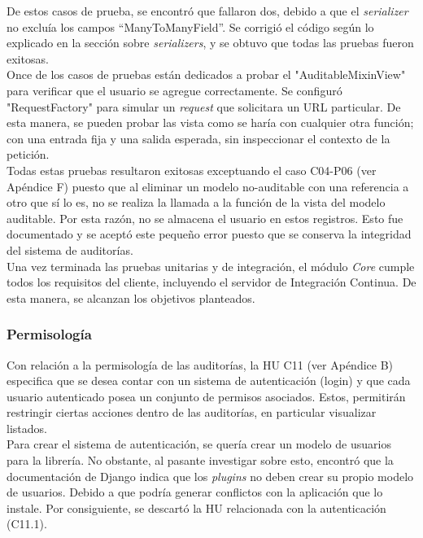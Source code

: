 De estos casos de prueba, se encontró que fallaron dos, debido a que el \textit{serializer} no excluía los campos “ManyToManyField”. Se corrigió el código según lo explicado en la sección sobre \textit{serializers}, y se obtuvo que todas las pruebas fueron exitosas.\\

Once de los casos de pruebas están dedicados a probar el "AuditableMixinView" para verificar que el usuario se agregue correctamente. Se configuró "RequestFactory" para simular un \textit{request} que solicitara un URL particular. De esta manera, se pueden probar las vista como se haría con cualquier otra función; con una entrada fija y una salida esperada, sin inspeccionar el contexto de la petición.\\

Todas estas pruebas resultaron exitosas exceptuando el caso C04-P06 (ver Apéndice F) puesto que al eliminar un modelo no-auditable con una referencia a otro que sí lo es, no se realiza la llamada a la función de la vista del modelo auditable. Por esta razón, no se almacena el usuario en estos registros. Esto fue documentado y se aceptó este pequeño error puesto que se conserva la integridad del sistema de auditorías.\\

Una vez terminada las pruebas unitarias y de integración, el módulo \textit{Core} cumple todos los requisitos del cliente, incluyendo el servidor de Integración Continua. De esta manera, se alcanzan los objetivos planteados.

\subsubsection{Permisología}

Con relación a la permisología de las auditorías, la HU C11 (ver Apéndice B) especifica que se desea contar con un sistema de autenticación (login) y que cada usuario autenticado posea un conjunto de permisos asociados. Estos, permitirán restringir ciertas acciones dentro de las auditorías, en particular visualizar listados. \\

Para crear el sistema de autenticación, se quería crear un modelo de usuarios para la librería. No obstante, al pasante investigar sobre esto, encontró que la documentación de Django indica que los \textit{plugins} no deben crear su propio modelo de usuarios. Debido a que podría generar conflictos con la aplicación que lo instale. Por consiguiente, se descartó la HU relacionada con la autenticación (C11.1). \\

